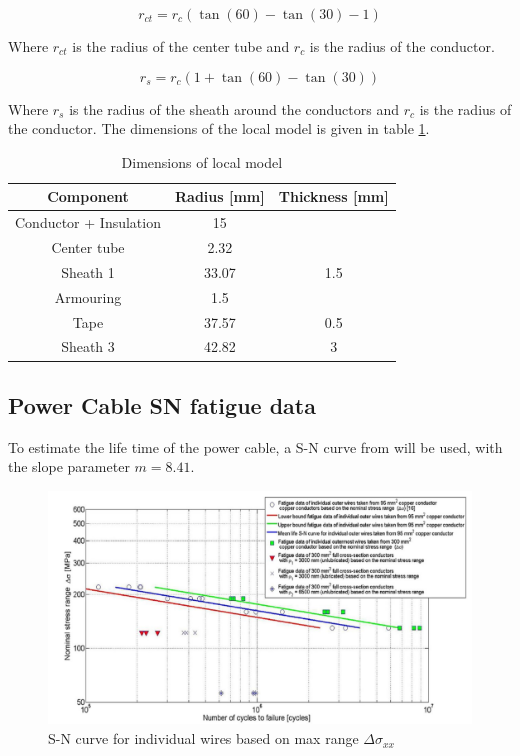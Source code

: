   \begin{equation}
   r_{ct} = r_c (\tan(60)-\tan(30)-1)
\end{equation}

 \noindent Where $r_{ct}$ is the radius of the center tube and $r_c$ is the radius of the conductor.

 \begin{equation}
   r_{s} = r_c (1+\tan(60)-\tan(30))
\end{equation}
 
  \noindent Where $r_{s}$ is the radius of the sheath around the conductors and $r_c$ is the radius of the conductor. \newline
  \newline 
  \noindent The dimensions of the local model is given in table \ref{table:dim}. 


\begin{table} [H]
\centering
\begin{tabular}{ |c|c|c|}
\hline
Component & Radius [mm] & Thickness [mm] \\
 \hline
 \hline
 Conductor + Insulation & 15 &\\

 Center tube & 2.32& \\
 
 Sheath 1 & 33.07 & 1.5 \\
 
Armouring & 1.5 &  \\

Tape & 37.57 & 0.5 \\

Sheath 3 & 42.82& 3  \\

 \hline
\end{tabular}
\caption{Dimensions of local model}
\label{table:dim}
\end{table} 
\subsection{Power Cable SN fatigue data}
To estimate the life time of the power cable, a S-N curve from \cite{savik2014} will be used, with the slope parameter $m=8.41$. 

\begin{figure}[H]
\centering
\includegraphics[scale=0.6]{figures/SNplot}
\caption[$\; \:$S-N curve for individual wires]{S-N curve for individual wires based on max range $\Delta \sigma_{xx}$ \cite{savik2014}}
 \label{fig:SNplot}
\end{figure}